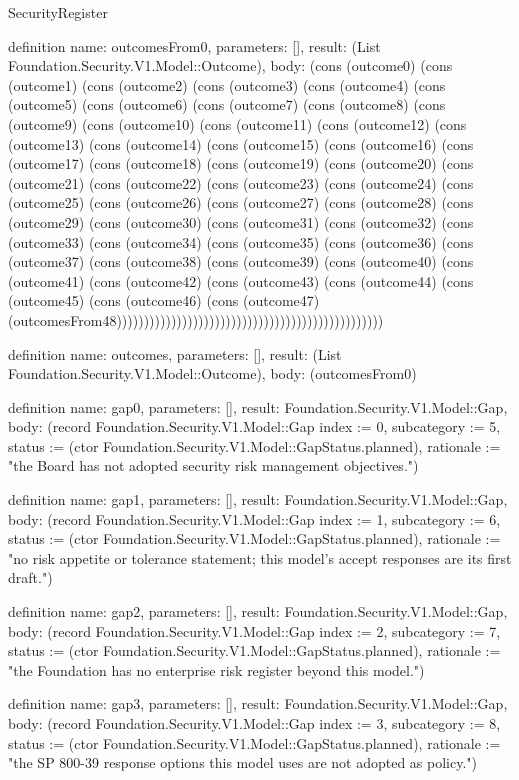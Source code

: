 \begin{lexlean}{SecurityRegister}
\begin{semanticmodule}
definition{
  name: outcomesFrom0,
  parameters: [],
  result: (List Foundation.Security.V1.Model::Outcome),
  body: (cons (outcome0) (cons (outcome1) (cons (outcome2) (cons (outcome3) (cons (outcome4) (cons (outcome5) (cons (outcome6) (cons (outcome7) (cons (outcome8) (cons (outcome9) (cons (outcome10) (cons (outcome11) (cons (outcome12) (cons (outcome13) (cons (outcome14) (cons (outcome15) (cons (outcome16) (cons (outcome17) (cons (outcome18) (cons (outcome19) (cons (outcome20) (cons (outcome21) (cons (outcome22) (cons (outcome23) (cons (outcome24) (cons (outcome25) (cons (outcome26) (cons (outcome27) (cons (outcome28) (cons (outcome29) (cons (outcome30) (cons (outcome31) (cons (outcome32) (cons (outcome33) (cons (outcome34) (cons (outcome35) (cons (outcome36) (cons (outcome37) (cons (outcome38) (cons (outcome39) (cons (outcome40) (cons (outcome41) (cons (outcome42) (cons (outcome43) (cons (outcome44) (cons (outcome45) (cons (outcome46) (cons (outcome47) (outcomesFrom48)))))))))))))))))))))))))))))))))))))))))))))))))
}

definition{
  name: outcomes,
  parameters: [],
  result: (List Foundation.Security.V1.Model::Outcome),
  body: (outcomesFrom0)
}

definition{
  name: gap0,
  parameters: [],
  result: Foundation.Security.V1.Model::Gap,
  body: (record Foundation.Security.V1.Model::Gap {index := 0, subcategory := 5, status := (ctor Foundation.Security.V1.Model::GapStatus.planned), rationale := "the Board has not adopted security risk management objectives."})
}

definition{
  name: gap1,
  parameters: [],
  result: Foundation.Security.V1.Model::Gap,
  body: (record Foundation.Security.V1.Model::Gap {index := 1, subcategory := 6, status := (ctor Foundation.Security.V1.Model::GapStatus.planned), rationale := "no risk appetite or tolerance statement; this model's accept responses are its first draft."})
}

definition{
  name: gap2,
  parameters: [],
  result: Foundation.Security.V1.Model::Gap,
  body: (record Foundation.Security.V1.Model::Gap {index := 2, subcategory := 7, status := (ctor Foundation.Security.V1.Model::GapStatus.planned), rationale := "the Foundation has no enterprise risk register beyond this model."})
}

definition{
  name: gap3,
  parameters: [],
  result: Foundation.Security.V1.Model::Gap,
  body: (record Foundation.Security.V1.Model::Gap {index := 3, subcategory := 8, status := (ctor Foundation.Security.V1.Model::GapStatus.planned), rationale := "the SP 800-39 response options this model uses are not adopted as policy."})
}


\end{semanticmodule}
\end{lexlean}
